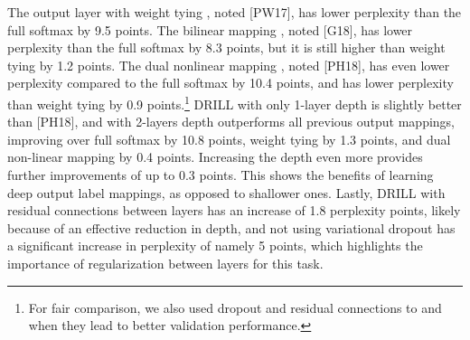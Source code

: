 \documentclass{article}
\begin{document}
The output layer with weight tying \cite{press17}, noted [PW17], has lower perplexity than the full softmax by 9.5 points. The bilinear mapping \cite{gulordava18}, noted [G18], has lower perplexity than the full softmax by 8.3 points, but it is still higher than weight tying by 1.2 points.  The dual nonlinear mapping \cite{pappas18}, noted [PH18], has even lower perplexity compared to the full softmax by 10.4 points, and has lower perplexity than weight tying by 0.9 points.\footnote{For fair comparison, we also used dropout and residual connections to  and  when they lead to better validation performance.} 
DRILL with only 1-layer depth is slightly better than [PH18], and with 2-layers depth outperforms all previous output mappings, improving over full softmax by 10.8 points, weight tying by 1.3 points, and dual non-linear mapping by 0.4 points. Increasing the depth even more provides further improvements of up to 0.3 points. This shows the benefits of learning deep output label mappings, as opposed to shallower ones. Lastly, DRILL with residual connections between layers  has an increase of 1.8 perplexity points, likely because of an effective reduction in depth, and not using variational dropout has a significant increase in perplexity of namely 5 points, which highlights the importance of regularization between layers for this task. 

 
\end{document}
